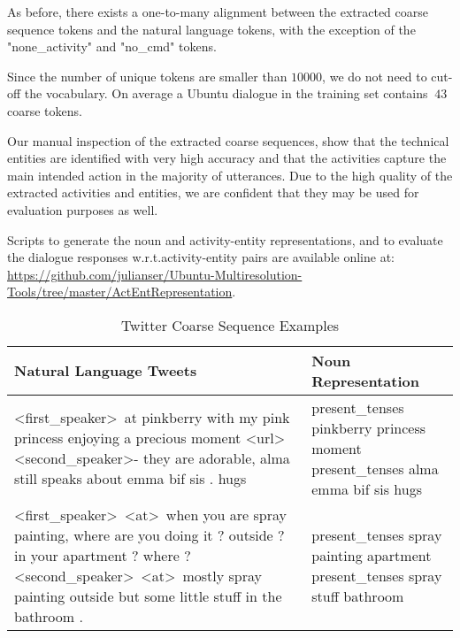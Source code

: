 \documentclass{article}
\begin{document}
As before, there exists a one-to-many alignment between the extracted coarse sequence tokens and the natural language tokens, with the exception of the "none\_activity" and "no\_cmd" tokens.

Since the number of unique tokens are smaller than $10000$, we do not need to cut-off the vocabulary. On average a Ubuntu dialogue in the training set contains $~43$ coarse tokens.

Our manual inspection of the extracted coarse sequences, show that the technical entities are identified with very high accuracy and that the activities capture the main intended action in the majority of utterances. Due to the high quality of the extracted activities and entities, we are confident that they may be used for evaluation purposes as well. 

Scripts to generate the noun and activity-entity representations, and to evaluate the dialogue responses w.r.t.\@ activity-entity pairs are available online at: \url{https://github.com/julianser/Ubuntu-Multiresolution-Tools/tree/master/ActEntRepresentation}.


\begin{table}[t]
  \caption{Twitter Coarse Sequence Examples}
  \label{TwitterCoarseSeqExamples}
  \centering
  \small
  \begin{tabular}{p{40mm}p{40mm}}
    Natural Language Tweets & Noun Representation \\
    \toprule
    \textless first\_speaker\textgreater \ at pinkberry with my pink princess enjoying a precious moment 	\textless url\textgreater \newline \newline \textless second\_speaker\textgreater - they are adorable, alma still speaks about emma bif sis . hugs  & present\_tenses pinkberry princess moment \newline \newline present\_tenses alma emma bif sis hugs    \\
    \midrule
    \textless first\_speaker\textgreater \  \textless at\textgreater \  when you are spray painting, where are you doing it ? outside ? in your apartment ? where ? \newline \newline
\textless second\_speaker\textgreater \  \textless at\textgreater \  mostly spray painting outside but
some little stuff in the bathroom .
&
present\_tenses spray painting apartment \newline \newline
present\_tenses spray stuff bathroom \\
    \bottomrule
  \end{tabular}
\end{table}
\end{document}
